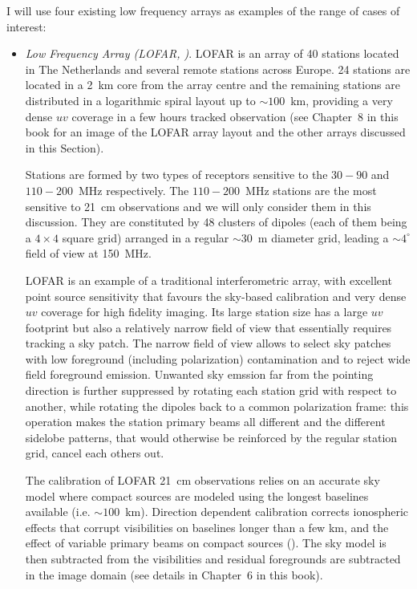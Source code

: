 {I will use four existing low frequency arrays as examples of the range of cases of interest:
\begin{itemize}

\item {\it Low Frequency Array (LOFAR, \cite{vanhaarlem13})}. LOFAR is an array of 40 stations located in The Netherlands and several remote stations across Europe. 24 stations are located in a 2~km core from the array centre and the remaining stations are distributed in a logarithmic spiral layout up to $\sim 100$~km, providing a very dense $uv$ coverage in a few hours tracked observation (see Chapter~8 in this book for an image of the LOFAR array layout and the other arrays discussed in this Section).

Stations are formed by two types of receptors sensitive to the $30-90$ and $110-200$~MHz respectively. The $110-200$~MHz stations are the most sensitive to 21~cm observations and we will only consider them in this discussion. They are constituted by 48 clusters of dipoles (each of them being a $4 \times 4$ square grid) arranged in a regular $\sim 30$~m diameter grid, leading a $\sim 4^\circ$ field of view at 150~MHz.

LOFAR is an example of a traditional interferometric array, with excellent point source sensitivity that favours the sky-based calibration and very dense $uv$ coverage for high fidelity imaging. Its large station size has a large $uv$ footprint but also a relatively narrow field of view that essentially requires tracking a sky patch. The narrow field of view allows to select sky patches with low foreground (including polarization) contamination and to reject wide field foreground emission. Unwanted sky emssion far from the pointing direction is further suppressed by rotating each station grid with respect to another, while rotating the dipoles back to a common polarization frame: this operation makes the station primary beams all different and the different sidelobe patterns, that would otherwise be reinforced by the regular station grid, cancel each others out.

The calibration of LOFAR 21~cm observations relies on an accurate sky model where compact sources are modeled using the longest baselines available (i.e. $\sim 100$~km). Direction dependent calibration corrects ionospheric effects that corrupt visibilities on baselines longer than a few km, and the effect of variable primary beams on compact sources (\cite{yatawatta13}). The sky model is then subtracted from the visibilities and residual foregrounds are subtracted in the image domain (see details in Chapter~6 in this book). 


\end{itemize}}
